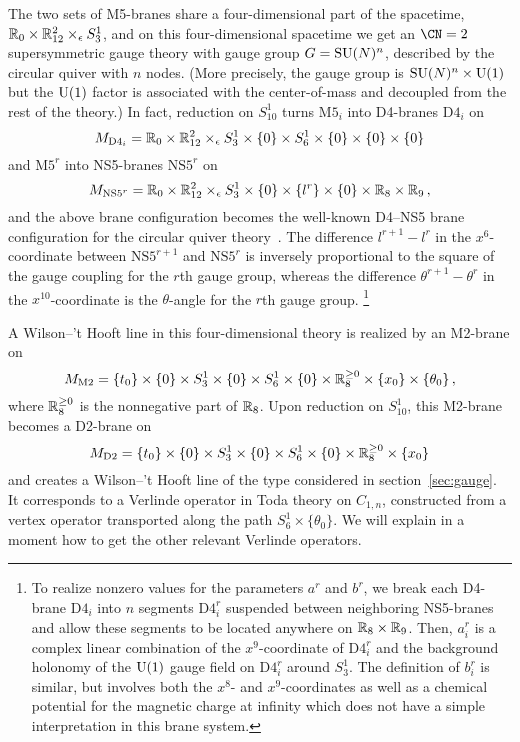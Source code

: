 The two sets of M5-branes share a four-dimensional part of the
spacetime, $\mathbb{R}_0 \times \mathbb{R}^2_{12} \times_\epsilon S^1_3$, and on this
four-dimensional spacetime we get an $\CN = 2$ supersymmetric gauge
theory with gauge group $G = \mathrm{SU}(N)^n$, described by the circular
quiver with $n$ nodes.  (More precisely, the gauge group is
$\mathrm{SU}(N)^n \times \mathrm{U}(1)$ but the $\mathrm{U}(1)$ factor is associated with the
center-of-mass and decoupled from the rest of the theory.)  In fact,
reduction on $S^1_{10}$ turns $\mathrm{M5}_i$ into D4-branes
$\mathrm{D4}_i$ on
\begin{equation}
  M_{\mathrm{D4}_i} =
  \mathbb{R}_0 \times \mathbb{R}^2_{12} \times_\epsilon S^1_3 \times \{0\}
  \times S^1_6 \times \{0\} \times \{0\} \times \{0\}
\end{equation}
and $\mathrm{M5}^r$ into NS5-branes $\mathrm{NS5}^r$ on
\begin{equation}
  M_{\mathrm{NS5}^r} =
  \mathbb{R}_0 \times \mathbb{R}^2_{12} \times_\epsilon S^1_3 \times \{0\}
  \times \{l^r\} \times \{0\} \times \mathbb{R}_8 \times \mathbb{R}_9 \,,
\end{equation}
and the above brane configuration becomes the well-known D4--NS5 brane
configuration for the circular quiver theory~\cite{Witten:1997sc}.
The difference $l^{r+1} - l^r$ in the $x^6$-coordinate between
$\mathrm{NS5}^{r+1}$ and $\mathrm{NS5}^r$ is inversely proportional to
the square of the gauge coupling for the $r$th gauge group, whereas
the difference $\theta^{r+1} - \theta^r$ in the $x^{10}$-coordinate is
the $\theta$-angle for the $r$th gauge group.%
%
\footnote{To realize nonzero values for the parameters $a^r$ and
  $b^r$, we break each D4-brane $\mathrm{D4}_i$ into $n$ segments
  $\mathrm{D4}_i^r$ suspended between neighboring NS5-branes and allow
  these segments to be located anywhere on $\mathbb{R}_8 \times \mathbb{R}_9$.  Then,
  $a^r_i$ is a complex linear combination of the $x^9$-coordinate of
  $\mathrm{D4}_i^r$ and the background holonomy of the $\mathrm{U}(1)$ gauge
  field on $\mathrm{D4}_i^r$ around $S^1_3$.  The definition of
  $b_i^r$ is similar, but involves both the $x^8$- and
  $x^9$-coordinates as well as a chemical potential for the magnetic
  charge at infinity which does not have a simple interpretation in
  this brane system.}

A Wilson--'t Hooft line in this four-dimensional theory is realized by
an M2-brane on
\begin{equation}
  M_{\mathrm{M2}} =
  \{t_0\} \times \{0\} \times S^1_3 \times \{0\}
  \times S^1_6 \times \{0\} \times \mathbb{R}^{\geq0}_8
  \times \{x_0\} \times \{\theta_0\} \,,
\end{equation}
where $\mathbb{R}^{\geq0}_8$ is the nonnegative part of $\mathbb{R}_8$.  Upon reduction on $S^1_{10}$, this M2-brane becomes a D2-brane on
\begin{equation}
  M_{\mathrm{D2}} =
  \{t_0\} \times \{0\} \times S^1_3 \times \{0\}
  \times S^1_6 \times \{0\} \times \mathbb{R}^{\geq0}_8
  \times \{x_0\}
\end{equation}
and creates a Wilson--'t Hooft line of the type considered in
section~\ref{sec:gauge}.  It corresponds to a Verlinde operator in
Toda theory on $C_{1,n}$, constructed from a vertex operator
transported along the path $S^1_6 \times \{\theta_0\}$.  We will
explain in a moment how to get the other relevant Verlinde operators.

